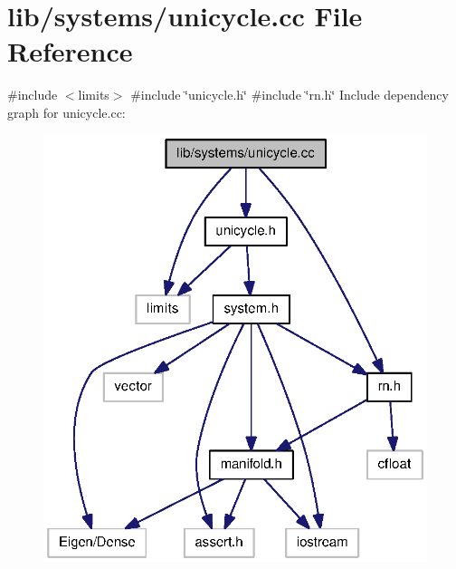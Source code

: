 \section{lib/systems/unicycle.cc \-File \-Reference}
\label{unicycle_8cc}
{\ttfamily \#include $<$limits$>$}\*
{\ttfamily \#include \char`\"{}unicycle.\-h\char`\"{}}\*
{\ttfamily \#include \char`\"{}rn.\-h\char`\"{}}\*
\-Include dependency graph for unicycle.\-cc\-:
\nopagebreak
\begin{figure}[H]
\begin{center}
\leavevmode
\includegraphics[width=322pt]{unicycle_8cc__incl}
\end{center}
\end{figure}
